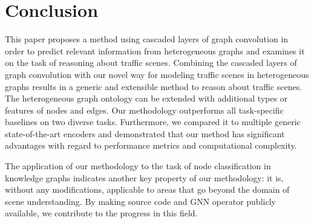\documentclass[letterpaper, 10 pt, journal, twoside]{IEEEtran}
\begin{document}
\section{Conclusion}
This paper proposes a method using cascaded layers of graph convolution in order to predict relevant information from heterogeneous graphs and examines it on the task of reasoning about traffic scenes.
Combining the cascaded layers of graph convolution with our novel way for modeling traffic scenes in heterogeneous graphs results in a generic and extensible method to reason about traffic scenes.
The heterogeneous graph ontology can be extended with additional types or features of nodes and edges.
Our methodology outperforms all task-specific baselines on two diverse tasks.
Furthermore, we compared it to multiple generic state-of-the-art encoders and demonstrated that our method has significant advantages with regard to performance metrics and computational complexity.

The application of our methodology to the task of node classification in knowledge graphs indicates another key property of our methodology:
it is, without any modifications, applicable to areas that go beyond the domain of scene understanding.
By making source code and GNN operator publicly available, we contribute to the progress in this field.

\ifCLASSOPTIONcaptionsoff
  \newpage
\fi




\enlargethispage{-5in}
\end{document}
